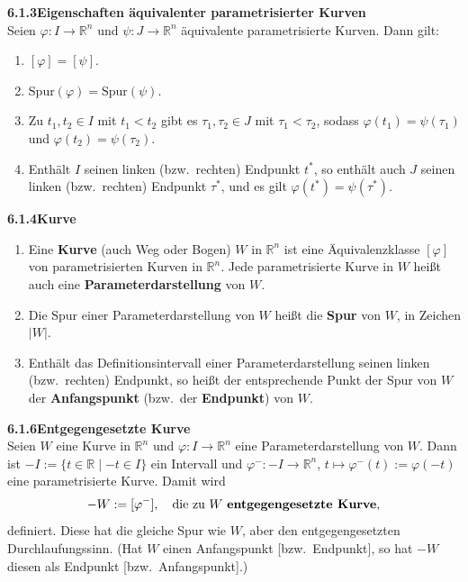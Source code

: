 \documentclass[a4paper,12pt]{article}
\newcommand{\gentry}[3]{%
  \noindent\textbf{#1\quad #2}\nopagebreak\\[0.2em]
  #3\par\smallskip
}
\begin{document}
\gentry{6.1.3}{Eigenschaften äquivalenter parametrisierter Kurven}{%
  Seien $\varphi : I \longrightarrow \mathbb{R}^n$ und $\psi : J \longrightarrow \mathbb{R}^n$
  äquivalente parametrisierte Kurven. Dann gilt:
  \begin{enumerate}[label=(\roman*),topsep=2pt,itemsep=1pt,start=0]
    \item $[\varphi] = [\psi]$.
    \item $\mathrm{Spur}(\varphi) = \mathrm{Spur}(\psi)$.
    \item Zu $t_1, t_2 \in I$ mit $t_1 < t_2$ gibt es $\tau_1, \tau_2 \in J$ mit $\tau_1 < \tau_2$,
          sodass $\varphi(t_1) = \psi(\tau_1)$ und $\varphi(t_2) = \psi(\tau_2)$.
    \item Enthält $I$ seinen linken (bzw.\ rechten) Endpunkt $t^*$, so enthält auch $J$
          seinen linken (bzw.\ rechten) Endpunkt $\tau^*$, und es gilt $\varphi(t^*) = \psi(\tau^*)$.
  \end{enumerate}
}

\gentry{6.1.4}{Kurve}{%
  \begin{enumerate}[label=(\roman*),topsep=2pt,itemsep=1pt]
    \item Eine \textbf{Kurve} (auch Weg oder Bogen) $W$ in $\mathbb{R}^n$ ist eine
          Äquivalenzklasse $[\varphi]$ von parametrisierten Kurven in $\mathbb{R}^n$.
          Jede parametrisierte Kurve in $W$ heißt auch eine \textbf{Parameterdarstellung} von $W$.
    \item Die Spur einer Parameterdarstellung von $W$ heißt die \textbf{Spur} von $W$,
          in Zeichen $|W|$.
    \item Enthält das Definitionsintervall einer Parameterdarstellung seinen linken
          (bzw.\ rechten) Endpunkt, so heißt der entsprechende Punkt der Spur von $W$
          der \textbf{Anfangspunkt} (bzw.\ der \textbf{Endpunkt}) von $W$.
  \end{enumerate}
}

\gentry{6.1.6}{Entgegengesetzte Kurve}{%
  Seien $W$ eine Kurve in $\mathbb{R}^n$ und $\varphi : I \longrightarrow \mathbb{R}^n$ eine
  Parameterdarstellung von $W$. Dann ist $-I := \{t \in \mathbb{R} \mid -t \in I\}$ ein
  Intervall und $\varphi^- : -I \longrightarrow \mathbb{R}^n$, $t \mapsto \varphi^-(t) := \varphi(-t)$
  eine parametrisierte Kurve. Damit wird
  \[
    -W := [\varphi^-], \quad \text{die zu } W \text{ \textbf{entgegengesetzte Kurve}},
  \]
  definiert. Diese hat die gleiche Spur wie $W$, aber den entgegengesetzten
  Durchlaufungssinn. (Hat $W$ einen Anfangspunkt [bzw.\ Endpunkt], so hat $-W$ diesen
  als Endpunkt [bzw.\ Anfangspunkt].)
}
\end{document}
